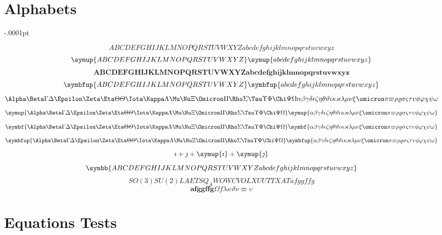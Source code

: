 \documentclass[11pt]{article}
\def\Latinalphabets{ABCDEFGHIJKLMNOPQRSTUVWXYZ}
\def\latinalphabets{abcdefghijklmnopqrstuvwxyz}
\def\Greekalphabets{%
  \Alpha      \Beta       \Gamma      \Delta      \Epsilon
  \Zeta       \Eta        \Theta      \varTheta   \Iota
  \Kappa      \Lambda     \Mu         \Nu         \Xi
  \Omicron    \Pi         \Rho        \Sigma      \Tau
  \Upsilon    \Phi        \Chi        \Psi        \Omega
}
\def\greekalphabets{%
  \alpha      \beta       \gamma      \delta      \epsilon
   \zeta       \eta        \theta      \vartheta 
  \iota       \kappa      \varkappa   \lambda     \mu
  \nu         \xi         \omicron    \pi \varpi        \rho
  \varrho     \sigma      \varsigma   \tau        \upsilon
  \phi        \varphi     \chi        \psi        \omega
}
\begin{document}
\section{Alphabets}
\delimitershortfall-.0001pt

       \[ \Latinalphabets \latinalphabets \]
       \[ \symup{\Latinalphabets} \symup{\latinalphabets} \]
       \[ \symbf{\Latinalphabets} \symbf{\latinalphabets}\]
       \[ \symbfup{\Latinalphabets}  \symbfup{\latinalphabets} \]
       \[ \Greekalphabets \greekalphabets\]
       \[ \symup{\Greekalphabets} \symup{\greekalphabets} \]
       \[ \symbf{\Greekalphabets} \symbf{\greekalphabets} \]
       \[ \symbfup{\Greekalphabets} \symbfup{\greekalphabets} \]
       \[ \imath + \jmath + \symup{\imath} + \symup{\jmath} \]
       \[ \symbb{\Latinalphabets \latinalphabets} \]
       \[SO(3)SU(2)LAETSQ_AWOWCVO LX UUTTXAT afggffg\]
       \[\symbf{afggffg} \Omega f \lambda\kappa\vartheta\nu\varpi\upsilon\]

\section{Equations Tests}
\end{document}
